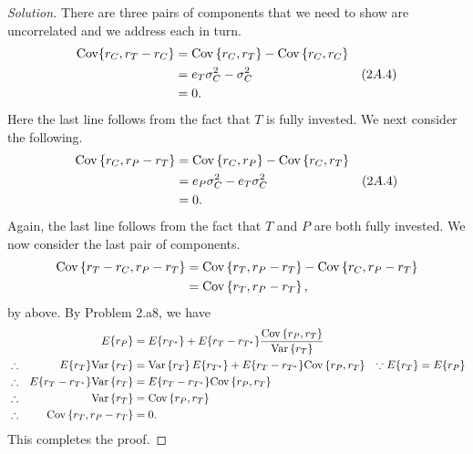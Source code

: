\begin{proof}[Solution]
There are three pairs of components that we need to show are uncorrelated and we address each in turn.
\begin{align*}
\mathrm{Cov}\{r_{C}, r_{T} - r_{C}\} &= \mathrm{Cov}\left\lbrace r_{C}, r_{T}\right\rbrace - \mathrm{Cov}\left\lbrace r_{C}, r_{C}\right\rbrace\\
&= e_{T}\sigma_{C}^{2} - \sigma_{C}^{2} & (2A.4)\\
&= 0.
\end{align*}
Here the last line follows from the fact that $T$ is fully invested. We next consider the following.
\begin{align*}
\mathrm{Cov}\left\lbrace r_{C}, r_{P} - r_{T}\right\rbrace &= \mathrm{Cov}\left\lbrace r_{C}, r_{P}\right\rbrace - \mathrm{Cov}\left\lbrace r_{C}, r_{T}\right\rbrace \\
&= e_{P}\sigma_{C}^{2} - e_{T}\sigma_{C}^{2} & (2A.4)\\
&= 0.
\end{align*}
Again, the last line follows from the fact that $T$ and $P$ are both fully invested. We now consider the last pair of components.
\begin{align*}
\mathrm{Cov}\left\lbrace r_{T} - r_{C}, r_{P} - r_{T}\right\rbrace &= \mathrm{Cov}\left\lbrace r_{T}, r_{P} - r_{T}\right\rbrace - \mathrm{Cov}\left\lbrace r_{C}, r_{P} - r_{T}\right\rbrace\\
&= \mathrm{Cov}\left\lbrace r_{T}, r_{P} - r_{T}\right\rbrace,
\end{align*}
by above. By Problem 2.a8, we have
\begin{align*}
&& E\{r_{P}\} &= E\{r_{T^{\ast}}\} + E\{r_{T} - r_{T^{\ast}}\}\frac{\mathrm{Cov}\left\lbrace r_{P}, r_{T}\right\rbrace}{\mathrm{Var}\left\lbrace r_{T}\right\rbrace}\\
& \therefore & E\{r_{T}\}\mathrm{Var}\left\lbrace r_{T}\right\rbrace &= \mathrm{Var}\left\lbrace r_{T}\right\rbrace E\{r_{T^{\ast}}\} + E\{r_{T} - r_{T^{\ast}}\}\mathrm{Cov}\left\lbrace r_{P}, r_{T}\right\rbrace & \because E\{r_{T}\} = E\{r_{P}\}\\
& \therefore & E\{r_{T} - r_{T^{\ast}}\}\mathrm{Var}\left\lbrace r_{T}\right\rbrace &= E\{r_{T} - r_{T^{\ast}}\}\mathrm{Cov}\left\lbrace r_{P}, r_{T}\right\rbrace\\
& \therefore & \mathrm{Var}\left\lbrace r_{T}\right\rbrace &= \mathrm{Cov}\left\lbrace r_{P}, r_{T}\right\rbrace \\
& \therefore & \mathrm{Cov}\left\lbrace r_{T}, r_{P} - r_{T}\right\rbrace &= 0.
\end{align*}
This completes the proof.
\end{proof}

